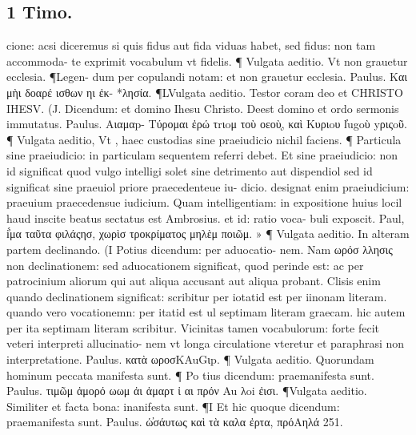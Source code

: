 \documentclass{article}
\begin{document}
\begin{pages}
\section*{1 Timo. }
\marginpar{[ p.211 ]}\pstart cione: acsi diceremus si quis fidus aut fida viduas habet, sed fidus: non tam accommoda-  te exprimit vocabulum vt fidelis. ¶ Vulgata aeditio. Vt non grauetur ecclesia. ¶Legen- dum per copulandi notam: et non grauetur ecclesia. Paulus. Και μὴι δοαρέ ισθων ηι ἐκ- *λησία. ¶LVulgata aeditio. Testor coram deo et CHRISTO IHESV. (J. Dicendum: et domino Ihesu Christo. Deest domino et ordo sermonis immutatus. Paulus. Aιαμαp-  Τύρομαι ἐρώ τrιoμ τοὺ οεοὺͅ, καὶ Κυριoυ l̓ugoὺ yριςoῦ. ¶ Vulgata aeditio, Vt , haec custodias sine praeiudicio nichil faciens. ¶ Particula sine praeiudicio: in particulam sequentem referri debet. Et sine praeiudicio: non id significat quod vulgo intelligi solet sine detrimento aut dispendiol sed id significat sine praeuiol priore praecedenteue iu- dicio. designat enim praeiudicium: praeuium praecedensue iudicium. Quam intelligentiam: in expositione huius locil haud inscite beatus sectatus est Ambrosius. et id: ratio voca- buli exposcit. Paul, i̓́μα ταῦτα φιλάςησ, χωρὶσ τροκρίματος μηλὲμ ποιῶμ. » ¶ Vulgata aeditio. In alteram partem declinando. (I Potius dicendum: per aduocatio- nem. Nam ωρόσ λλησις non declinationem: sed aduocationem significat, quod perinde est: ac per patrocinium aliorum qui aut aliqua accusant aut aliqua probant. Clisis enim quando declinationem significat: scribitur per iotatid est per iinonam literam. quando vero vocationemn: per itatid est ul septimam literam graecam. hic autem per ita septimam literam scribitur. Vicinitas tamen vocabulorum: forte fecit veteri interpreti allucinatio- nem vt longa circulatione vteretur et paraphrasi non interpretatione. Paulus. κατὰ ωροσΚAuGιp. ¶ Vulgata aeditio. Quorundam hominum peccata manifesta sunt. ¶ Po tius dicendum: praemanifesta sunt. Paulus. τιμῶμ ἀμορό ωωμ ἀι ἀμαρτ ἰ αι πρόν Au λoi ἐισι. ¶Vulgata aeditio. Similiter et facta bona: inanifesta sunt. ¶I Et hic quoque  dicendum: praemanifesta sunt. Paulus. ὡ̓σάυτως καὶ τὰ καλα ἐρτα, πρόAηλά 251.  \pend

\end{pages}
\end{document}

